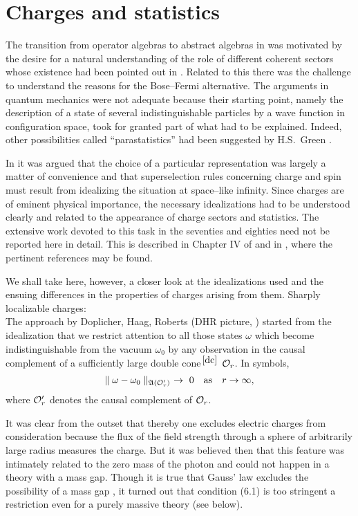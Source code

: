 \section{Charges and statistics}
\setcounter{equation}{0}
The transition from operator algebras to abstract algebras in 
\cite{HaKa} was motivated by the desire for a natural understanding 
of the role of different coherent sectors whose existence had been 
pointed out in \cite{WiWiWi}. Related to this there was the 
challenge to understand the reasons for the Bose--Fermi
alternative. The arguments in quantum mechanics were not adequate
because their starting point, namely the description of a state of
several indistinguishable particles by a wave function in
configuration space, took for granted part of what had to be 
explained. Indeed, other possibilities called
``parastatistics'' had been suggested by H.S.\ Green \cite{Gr}.

In \cite{HaKa} it was argued that the choice of a particular
representation was largely a matter of convenience and that
superselection rules concerning charge and spin must result from 
idealizing the situation at space--like
infinity. Since charges are of eminent physical importance,
the necessary idealizations had to be understood
clearly and related to the appearance of charge sectors and
statistics. The extensive work devoted to this task in the seventies
and eighties need not be reported here in detail. This is described in
Chapter IV of \cite{Ha} and in \cite{BaWo,Ka}, where the pertinent
references may be found.

We shall take here, however, a closer look at the idealizations used
and the ensuing differences in the properties of charges arising from
them. \newpage 
{\noindent \subsect Sharply localizable charges:}\\[2mm]
The approach by Doplicher, Haag, Roberts (DHR picture, \cite{DoHaRo})
started from the idealization that we restrict attention to all those
states $\omega$ which become 
indistinguishable from the vacuum $\omega_0$ by any
observation in the causal complement of a sufficiently large double
cone$^{\, \ref{dc}}$ ${\cal O}_r$. In symbols,
\begin{equation}
\parallel  \omega - \omega_0  
\parallel_{{\mathfrak A} ({\cal O}_r^\prime)} \ \to \ 0 \quad
\mbox{\rm as} \quad r \to \infty, 
\end{equation}  
where ${\cal O}_r^\prime$ denotes the causal complement of ${\cal O}_r$.

It was clear from the outset that thereby one excludes electric charges
from consideration because the flux of the field strength through a
sphere of arbitrarily large radius measures the charge. But it was
believed then that this feature was intimately related to the zero
mass of the photon and could not happen in a theory with a mass gap.
Though it is true that Gauss' law excludes the possibility of a mass
gap \cite{Sw}, 
it turned out that condition (6.1) is too stringent a restriction
even for a purely massive theory (see below).

